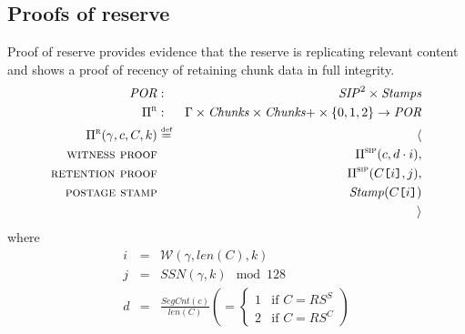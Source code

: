 \subsection{Proofs of reserve}
\label{sec:proofs}
    
\begin{definition}
\label{def:por}
Proof of reserve provides evidence that the reserve is replicating relevant content and shows a proof of recency of retaining chunk data in full integrity.
%
\begin{eqnarray}
\mathit{POR}&:&\mathit{SIP}^2\times\mathit{Stamps}\\
\Pi^{\textsc{r}}&:&\Gamma\times\mathit{Chunks}\times\mathit{Chunks}{+}\times\{0,1,2\}\to\mathit{POR}\\
\Pi^{\textsc{r}}(\gamma,c,C,k)&\overset{\textrm{\tiny def}}{=}&\langle\\
\textsc{witness proof}&&\Pi^{\textsc{sip}}(c,d\cdot i), \\
\textsc{retention proof}&&\Pi^{\textsc{sip}}(C\texttt{[}\/i\/\texttt{]},j), \\
\textsc{postage stamp}&&\mathit{Stamp}(C\texttt{[}\/i\/\texttt{]})\\
&&\rangle
\end{eqnarray}
where 
\begin{eqnarray}
i&=&\mathcal{W}(\gamma,\mathit{len}(C),k)\\
j&=& \mathit{SSN}(\gamma,k)\mod 128\\
d &=&\frac{\mathit{SegCnt}(c)}{\mathit{len}(C)} \left(=\begin{cases}
    1& \text{if } C=RS^S\\
2 &\text{if } C=RS^C
\end{cases}
\right)
\end{eqnarray}
\end{definition}


